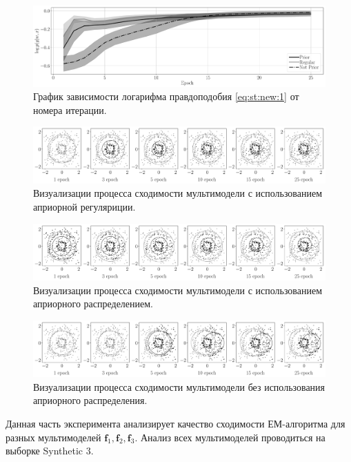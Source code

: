 \begin{figure}[h!t]\center
\includegraphics[width=1\textwidth]{results/priorexpert/experiment_synt_likelihood_progress}
\caption{График зависимости логарифма правдоподобия \eqref{eq:st:new:1} от номера итерации.}
\label{experiment:st:2:2}
\end{figure}

\begin{figure}[h!t]\center
\includegraphics[width=1\textwidth]{results/priorexpert/experiment_synt_regular_progress}
\caption{Визуализации процесса сходимости мультимодели с использованием априорной регуляриции.}
\label{experiment:st:2:3}
\end{figure}

\begin{figure}[h!t]\center
\includegraphics[width=1\textwidth]{results/priorexpert/experiment_synt_prior_progress}
\caption{Визуализации процесса сходимости мультимодели с использованием априорного распределением.}
\label{experiment:st:2:4}
\end{figure}

\begin{figure}[h!t]\center
\includegraphics[width=1\textwidth]{results/priorexpert/experiment_synt_not_prior_progress}
\caption{Визуализации процесса сходимости мультимодели без использования априорного распределения.}
\label{experiment:st:2:5}
\end{figure}
Данная часть эксперимента анализирует качество сходимости ЕМ-алгоритма для разных мультимоделей $\textbf{f}_1, \textbf{f}_2, \textbf{f}_3$.
Анализ всех мультимоделей проводиться на выборке Synthetic 3.

